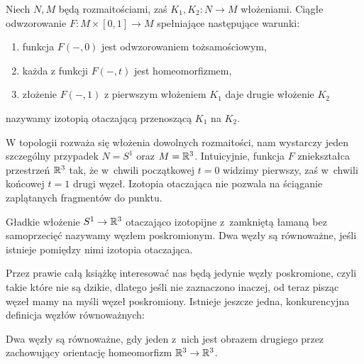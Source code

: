 \begin{definition}
%
    Niech $N, M$ będą rozmaitościami, zaś $K_1, K_2 \colon N \to M$ włożeniami.
    Ciągłe odwzorowanie $F \colon M \times [0,1] \to M$ spełniające następujące warunki:
    \begin{enumerate}
        \item funkcja $F(-, 0)$ jest odwzorowaniem tożsamościowym,
        \item każda z funkcji $F(-, t)$ jest homeomorfizmem,
        \item złożenie $F(-, 1)$ z pierwszym włożeniem $K_1$ daje drugie włożenie $K_2$
    \end{enumerate}
    nazywamy izotopią otaczającą przenoszącą $K_1$ na $K_2$.
\end{definition}

W topologii rozważa się włożenia dowolnych rozmaitości, nam wystarczy jeden szczególny przypadek $N = S^1$ oraz $M = \mathbb R^3$.
Intuicyjnie, funkcja $F$ zniekształca przestrzeń $\mathbb R^3$ tak, że w~chwili początkowej $t = 0$ widzimy pierwszy, zaś w~chwili końcowej $t = 1$ drugi węzeł.
Izotopia otaczająca nie pozwala na ściąganie zaplątanych fragmentów do punktu.


\begin{definition}[węzeł]
%
\label{def:knot}%
    Gładkie włożenie $S^1 \to \mathbb R^3$ otaczająco izotopijne z~zamkniętą łamaną bez samoprzecięć nazywamy węzłem poskromionym.
    Dwa węzły są równoważne, jeśli istnieje pomiędzy nimi izotopia otaczająca.
\end{definition}

Przez prawie całą książkę interesować nas będą jedynie węzły poskromione, czyli takie które nie są dzikie,
dlatego jeśli nie zaznaczono inaczej, od teraz pisząc węzeł mamy na myśli węzeł poskromiony.
Istnieje jeszcze jedna, konkurencyjna definicja węzłów równoważnych:

\begin{proposition}
\label{def:equivalent_knots_2}%
    Dwa węzły są równoważne, gdy jeden z~nich jest obrazem drugiego przez zachowujący orientację homeomorfizm $\mathbb R^3 \to \mathbb R^3$.
\end{proposition}

